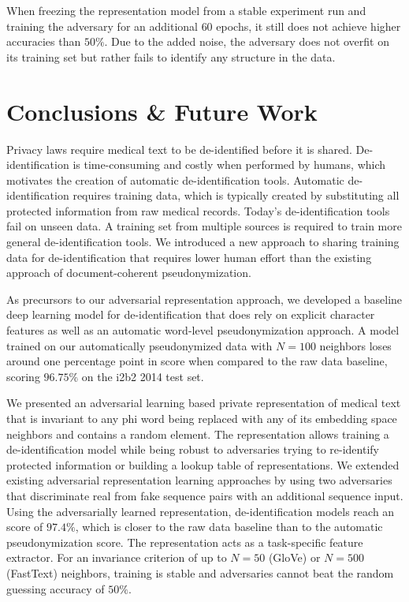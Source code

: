 \begin{description}
    When freezing the representation model from a stable experiment run and training the adversary for an additional $60$ epochs, it still does not achieve higher accuracies than $50\%$.
    Due to the added noise, the adversary does not overfit on its training set but rather fails to identify any structure in the data.    
\end{description}

\section{Conclusions \& Future Work}
%
Privacy laws require medical text to be de-identified before it is shared.
%
De-identifi\-ca\-tion is time-consuming and costly when performed by humans, which motivates the creation of automatic de-identification tools.
%
Automatic de-identification requires training data, which is typically created by substituting all protected information from raw medical records.
%
Today's de-identification tools fail on unseen data.
%
A training set from multiple sources is required to train more general de-identification tools.
%
We introduced a new approach to sharing training data for de-identification that requires lower human effort than the existing approach of document-coherent pseudonymization.

%
As precursors to our adversarial representation approach, we developed a baseline deep learning model for de-identification that does rely on explicit character features as well as an automatic word-level pseudonymization approach.
%
A model trained on our automatically pseudonymized data with $N=100$ neighbors loses around one percentage point in \fone score when compared to the raw data baseline, scoring $96.75\%$ on the i2b2 2014 test set.

%
We presented an adversarial learning based private representation of medical text that is invariant to any \ac{phi} word being replaced with any of its embedding space neighbors and contains a random element.
%
The representation allows training a de-identification model while being robust to adversaries trying to re-identify protected information or building a lookup table of representations.
%
We extended existing adversarial representation learning approaches by using two adversaries that discriminate real from fake sequence pairs with an additional sequence input.
%
Using the adversarially learned representation, de-identification models reach an \fone score of $97.4\%$, which is closer to the raw data baseline than to the automatic pseudonymization score.
%
The representation acts as a task-specific feature extractor.
%
For an invariance criterion of up to $N=50$ (GloVe) or $N=500$ (FastText) neighbors, training is stable and adversaries cannot beat the random guessing accuracy of $50\%$.

